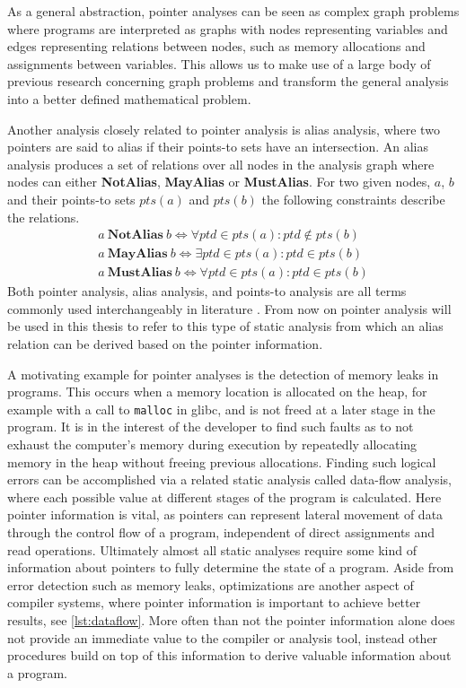 As a general abstraction, pointer analyses can be seen as complex graph problems where programs are interpreted as graphs with nodes representing variables and edges representing relations between nodes, such as memory allocations and assignments between variables.
This allows us to make use of a large body of previous research concerning graph problems and transform the general analysis into a better defined mathematical problem.

Another analysis closely related to pointer analysis is alias analysis, where two pointers are said to alias if their points-to sets have an intersection. An alias analysis produces a set of relations over all nodes in the analysis graph where nodes can either \textbf{NotAlias}, \textbf{MayAlias} or \textbf{MustAlias}.
For two given nodes, $a$, $b$ and their points-to sets $pts(a)$ and $pts(b)$ the following constraints describe the relations.
\begin{align}
    a\ \textbf{NotAlias}\ b \iff \forall ptd \in pts(a) \colon ptd \notin pts(b)\label{eq:alias1} \\
    a\ \textbf{MayAlias}\ b \iff \exists ptd \in pts(a) \colon ptd \in pts(b)\label{eq:alias2}    \\
    a\ \textbf{MustAlias}\ b \iff \forall ptd \in pts(a) \colon ptd \in pts(b)
\end{align}
Both pointer analysis, alias analysis, and points-to analysis are all terms commonly used interchangeably in literature \cite{hind2001pointer}. From now on pointer analysis will be used in this thesis to refer to this type of static analysis from which an alias relation can be derived based on the pointer information.

A motivating example for pointer analyses is the detection of memory leaks in programs.
This occurs when a memory location is allocated on the heap, for example with a call to \verb|malloc| in glibc, and is not freed at a later stage in the program.
It is in the interest of the developer to find such faults as to not exhaust the computer's memory during execution by repeatedly allocating memory in the heap without freeing previous allocations.
Finding such logical errors can be accomplished via a related static analysis called data-flow analysis, where each possible value at different stages of the program is calculated. Here pointer information is vital, as pointers can represent lateral movement of data through the control flow of a program, independent of direct assignments and read operations. Ultimately almost all static analyses require some kind of information about pointers to fully determine the state of a program.
Aside from error detection such as memory leaks, optimizations are another aspect of compiler systems, where pointer information is important to achieve better results, see \autoref{lst:dataflow}.
More often than not the pointer information alone does not provide an immediate value to the compiler or analysis tool, instead other procedures build on top of this information to derive valuable information about a program.


